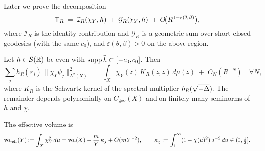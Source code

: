 \begin{remark}
Later we prove the decomposition
\[
\mathsf{T}_R \;=\; \mathcal{I}_R(\chi_Y,h)\;+\;\mathcal{G}_R(\chi_Y,h)\;+\;O\!\big(R^{1-\varepsilon(\theta,\beta)}\big),
\]
where $\mathcal{I}_R$ is the identity contribution and $\mathcal{G}_R$ is a geometric sum over short closed geodesics (with the same $c_0$), and $\varepsilon(\theta,\beta)>0$ on the above region.
\end{remark}

\begin{lemma}\label{lem:planch}
Let $h\in\mathcal{S}(\mathbb{R})$ be even with $\operatorname{supp}\widehat{h}\subset[-c_0,c_0]$.
Then
\[
  \sum_j h_R(r_j)\,\|\chi_Y\psi_j\|_{L^2(X)}^2
  \;=\; \int_X \chi_Y(z)\,K_R(z,z)\,d\mu(z) \;+\; O_N(R^{-N})\quad\forall N,
\]
where $K_R$ is the Schwartz kernel of the spectral multiplier $h_R(\sqrt{-\Delta})$.
The remainder depends polynomially on $C_{\mathrm{geo}}(X)$ and on finitely many seminorms of $h$ and $\chi$.
\end{lemma}

\begin{remark}
The effective volume is
\[
\operatorname{vol}_{\mathrm{eff}}(Y):=\int_X \chi_Y^2\,d\mu
=\operatorname{vol}(X)-\frac{m}{Y}\,\kappa_\chi+O(mY^{-2}),
\qquad
\kappa_\chi:=\int_1^\infty (1-\chi(u)^2)\,u^{-2}\,du\in(0,\tfrac12].
\]
\end{remark}
